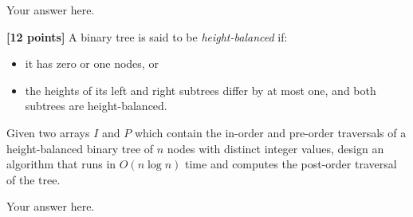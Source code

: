 \documentclass{article}
\begin{document}
\begin{Question}
\begin{Subquestion}
\begin{answer}
Your answer here.
\end{answer}
\end{Subquestion}

\begin{Subquestion}
\textbf{[12 points]} A binary tree is said to be \emph{height-balanced} if:
\begin{itemize}
    \item it has zero or one nodes, or
    \item the heights of its left and right subtrees differ by at most one, and both subtrees are height-balanced.
\end{itemize}
Given two arrays $I$ and $P$ which contain the in-order and pre-order traversals of a height-balanced binary tree of $n$ nodes with distinct integer values, design an algorithm that runs in $O(n \log n)$ time and computes the post-order traversal of the tree.

\begin{answer}
Your answer here.
\end{answer}
\end{Subquestion}
\end{Question}
\end{document}
